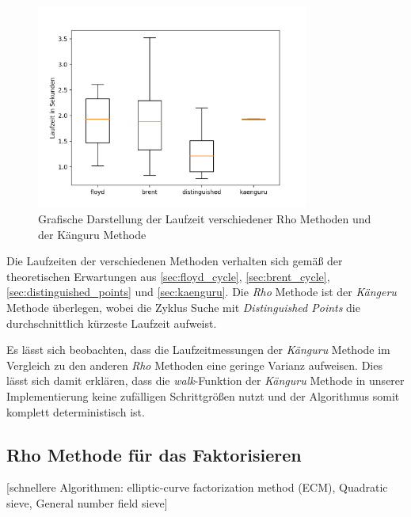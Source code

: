 \documentclass{scrartcl}
\begin{document}
\begin{figure}[h]
  \centering
  \includegraphics[width=0.8\textwidth]{../projekt/benchmark/plot.png}
  \caption{Grafische Darstellung der Laufzeit verschiedener Rho Methoden und der Känguru Methode}
  \label{fig:benchmark}
\end{figure}

Die Laufzeiten der verschiedenen Methoden verhalten sich gemäß der
theoretischen Erwartungen aus \ref{sec:floyd_cycle},
\ref{sec:brent_cycle}, \ref{sec:distinguished_points} und
\ref{sec:kaenguru}.
Die \emph{Rho} Methode ist der \emph{Kängeru} Methode überlegen,
wobei die Zyklus Suche mit \emph{Distinguished Points} die durchschnittlich
kürzeste Laufzeit aufweist.

Es lässt sich beobachten, dass die Laufzeitmessungen der \emph{Känguru}
Methode im Vergleich zu den anderen \emph{Rho} Methoden eine geringe Varianz
aufweisen.
Dies lässt sich damit erklären, dass die \emph{walk}-Funktion der
\emph{Känguru} Methode in unserer Implementierung keine zufälligen
Schrittgrößen nutzt und der Algorithmus somit komplett deterministisch
ist.

\subsection{Rho Methode für das Faktorisieren}
\label{sec:rho_faktorisieren}

[schnellere Algorithmen: elliptic-curve factorization method (ECM), Quadratic sieve, General number field sieve]

\cite{Pollard1975}

\newpage
\printbibliography[heading=bibintoc]
\end{document}
